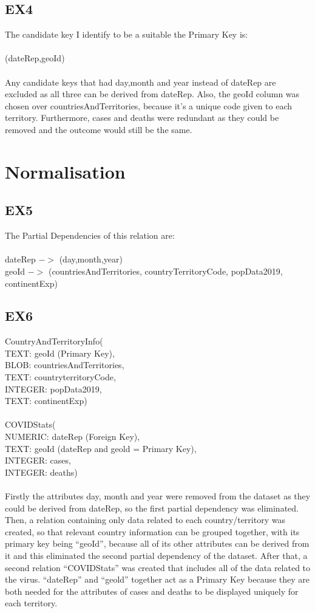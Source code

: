 \documentclass{report}
\begin{document}
\subsection{EX4}
The candidate key I identify to be a suitable the Primary Key is:\\ \\
(dateRep,geoId) \\ \\
Any candidate keys that had day,month and year instead of dateRep are excluded as all three can be derived from dateRep. Also, the geoId column was chosen over countriesAndTerritories, because it’s a unique code given to each territory. Furthermore, cases and deaths were redundant as they could be removed and the outcome would still be the same.

\section{Normalisation}
\subsection{EX5}
The Partial Dependencies of this relation are:\\ \\
dateRep $->$ (day,month,year) \\
geoId $->$ (countriesAndTerritories, countryTerritoryCode, popData2019,\\ continentExp)

\subsection{EX6}
CountryAndTerritoryInfo(\\TEXT: geoId (Primary Key),\\  BLOB: countriesAndTerritories,\\ TEXT: countryterritoryCode,\\ INTEGER: popData2019,\\ TEXT: continentExp) \\ \\
COVIDStats(\\NUMERIC: dateRep (Foreign Key),\\ TEXT: geoId (dateRep and geold = Primary Key),\\ INTEGER: cases,\\ INTEGER: deaths) \\ \\

Firstly the attributes day, month and year were removed from the dataset as they could be derived from dateRep, so the first partial dependency was eliminated. Then, a relation containing only data related to each country/territory was created, so that relevant country information can be grouped together, with its primary key being “geoId”, because all of its other attributes can be derived from it and this eliminated the second partial dependency of the dataset. After that, a second relation “COVIDStats” was created that includes all of the data related to the virus. “dateRep” and “geold” together act as a Primary Key because they are both needed for the attributes of cases and deaths to be displayed uniquely for each territory.
\end{document}
